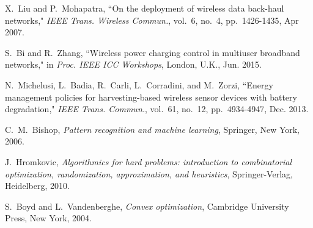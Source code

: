 \documentclass[journal, draftcls, one column, 12pt]{IEEEtran}
\begin{document}
\begin{thebibliography}{1}
X.~Liu and P.~Mohapatra, ``On the deployment of wireless data back-haul networks," \emph{IEEE Trans. Wireless Commun.}, vol.~6, no.~4, pp.~1426-1435, Apr 2007.

S.~Bi and R.~Zhang, ``Wireless power charging control in multiuser broadband networks," in \emph{Proc. IEEE ICC Workshops}, London, U.K., Jun. 2015.

N.~Michelusi, L.~Badia, R.~Carli, L.~Corradini, and M.~Zorzi,  ``Energy management policies for harvesting-based wireless sensor devices with battery degradation," \emph{IEEE Trans. Commun.}, vol.~61, no.~12, pp.~4934-4947, Dec. 2013.

C.~M.~Bishop, \emph{Pattern recognition and machine learning}, Springer, New York, 2006.

J.~Hromkovic, \emph{Algorithmics for hard problems: introduction to combinatorial optimization, randomization, approximation, and heuristics}, Springer-Verlag, Heidelberg, 2010.

S.~Boyd and L.~Vandenberghe, \emph{Convex optimization}, Cambridge University Press, New York, 2004.

\end{thebibliography}
\end{document}

